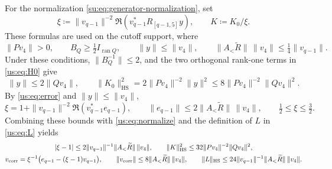 \documentclass[11pt]{article}
\numberwithin{equation}{section}
\theoremstyle{remark}
\newcommand{\ran}{\operatorname{ran}}
\newcommand{\HS}{\mathrm{HS}}
\begin{document}
For the normalization \eqref{su:eq:generator-normalization}, set
\begin{equation}\label{us:eq:normalize}
 \xi\coloneqq\|v_{q-1}\|^{-2} \Re(v_{q-1}^*R_{[q-1,5]}y),\qquad
 K\coloneqq K_0/\xi.
\end{equation}
These formulas are used on the cutoff support, where
\begin{equation}\label{su:eq:generator-admissibility}
 \|Pv_4\|>0,\qquad B_Q\ge\tfrac12 I_{\ran Q},\qquad
 \|y\|\le\|v_4\|,\qquad \|A_<\widetilde R\|\,\|v_4\|\le\tfrac14\|v_{q-1}\|.
\end{equation}
Under these conditions, $\|B_Q^{-1}\|\le2$, and the two orthogonal
rank-one terms in \eqref{us:eq:H0} give
\begin{equation}\label{us:eq:sourceenergy}
 \|y\|\le2\|Qv_4\|,\qquad
 \|K_0\|_{\HS}^2=2\|Pv_4\|^{-2} \|y\|^2\le8\|Pv_4\|^{-2} \|Qv_4\|^2.
\end{equation}
By \eqref{us:eq:error} and $\|y\|\le\|v_4\|$,
\[
 \xi=1+\|v_{q-1}\|^{-2} \Re(v_{q-1}^*e_{q-1}),\qquad
 \|e_{q-1}\|\le2\|A_<\widetilde R\|\,\|v_4\|,\qquad
 \tfrac12\le\xi\le\tfrac32.
\]
Combining these bounds with \eqref{us:eq:normalize} and the definition
of $L$ in \eqref{us:eq:L} yields
\begin{equation}\label{su:eq:normalized-generator-costs}
 \begin{gathered}
 |\xi-1|\le2\|v_{q-1}\|^{-1} \|A_<\widetilde R\|\,\|v_4\|,\qquad \|K\|_{\HS}^2\le32\|Pv_4\|^{-2} \|Qv_4\|^2,\\
 v_{\rm corr}=\xi^{-1}\bigl(e_{q-1}-(\xi-1)v_{q-1}\bigr),\qquad
 \|v_{\rm corr}\|\le8\|A_<\widetilde R\|\,\|v_4\|,\qquad
 \|L\|_{\HS}\le24\|v_{q-1}\|^{-1} \|A_<\widetilde R\|\,\|v_4\|.
 \end{gathered}
\end{equation}
\end{document}
